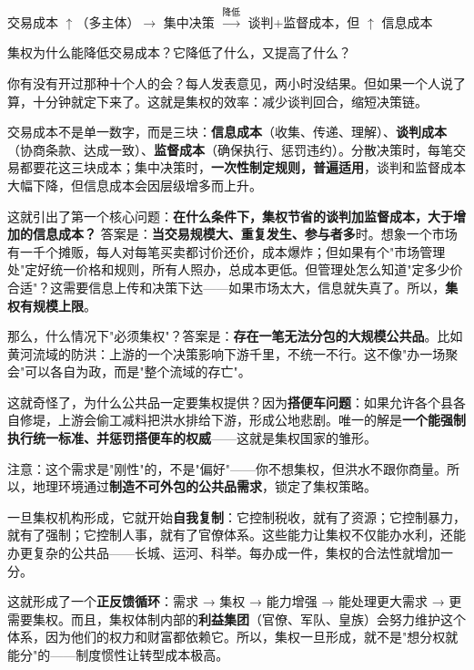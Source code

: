 \documentclass[../main.tex]{subfiles}
\begin{document}
	\begin{logicmap}
		交易成本 $\uparrow$（多主体）$\rightarrow$ 集中决策 $\xrightarrow{\text{降低}}$ 谈判+监督成本，但 $\uparrow$ 信息成本
	\end{logicmap}
	
	\begin{questionbox}
		集权为什么能降低交易成本？它降低了什么，又提高了什么？
	\end{questionbox}
	
	你有没有开过那种十个人的会？每人发表意见，两小时没结果。但如果一个人说了算，十分钟就定下来了。这就是集权的效率：减少谈判回合，缩短决策链。

	交易成本不是单一数字，而是三块：\textbf{信息成本}（收集、传递、理解）、\textbf{谈判成本}（协商条款、达成一致）、\textbf{监督成本}（确保执行、惩罚违约）。分散决策时，每笔交易都要花这三块成本；集中决策时，\textbf{一次性制定规则，普遍适用}，谈判和监督成本大幅下降，但信息成本会因层级增多而上升。

	这就引出了第一个核心问题：\textbf{在什么条件下，集权节省的谈判加监督成本，大于增加的信息成本？} 答案是：\textbf{当交易规模大、重复发生、参与者多}时。想象一个市场有一千个摊贩，每人对每笔买卖都讨价还价，成本爆炸；但如果有个"市场管理处"定好统一价格和规则，所有人照办，总成本更低。但管理处怎么知道"定多少价合适"？这需要信息上传和决策下达——如果市场太大，信息就失真了。所以，\textbf{集权有规模上限}。
	
	那么，什么情况下"必须集权"？答案是：\textbf{存在一笔无法分包的大规模公共品}。比如黄河流域的防洪：上游的一个决策影响下游千里，不统一不行。这不像"办一场聚会"可以各自为政，而是"整个流域的存亡"。

	这就奇怪了，为什么公共品一定要集权提供？因为\textbf{搭便车问题}：如果允许各个县各自修堤，上游会偷工减料把洪水排给下游，形成公地悲剧。唯一的解是\textbf{一个能强制执行统一标准、并惩罚搭便车的权威}——这就是集权国家的雏形。

	注意：这个需求是"刚性"的，不是"偏好"——你不想集权，但洪水不跟你商量。所以，地理环境通过\textbf{制造不可外包的公共品需求}，锁定了集权策略。
	
	一旦集权机构形成，它就开始\textbf{自我复制}：它控制税收，就有了资源；它控制暴力，就有了强制；它控制人事，就有了官僚体系。这些能力让集权不仅能办水利，还能办更复杂的公共品——长城、运河、科举。每办成一件，集权的合法性就增加一分。

	这就形成了一个\textbf{正反馈循环}：需求 → 集权 → 能力增强 → 能处理更大需求 → 更需要集权。而且，集权体制内部的\textbf{利益集团}（官僚、军队、皇族）会努力维护这个体系，因为他们的权力和财富都依赖它。所以，集权一旦形成，就不是"想分权就能分"的——制度惯性让转型成本极高。
	
\end{document}
